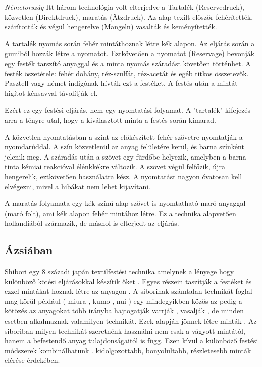 \documentclass[fontsize=12pt, appendixprefix=true]{scrreprt}
\begin{document}
\textit{Németország} 
Itt három technológia volt elterjedve a Tartalék (Reservedruck), közvetlen (Direktdruck), maratás (Ätzdruck). Az alap texílt először fehérítették, szárították és végül hengerelve (Mangeln) vasalták és keményítették.

A tartalék nyomás során fehér mintáthoznak létre kék alapon. Az eljárás során a gumiból hozzák létre a nyomatot. Eztkövetően a nyomatot (Reservage) bevonják egy festék tarszító anyaggal és a minta nyomás száradást követően történhet. A festék öszetétele: fehér dohány, réz-szulfát, réz-acetát és egéb titkos összetevők. Pasztell vagy német indigónak hívták ezt a festéket. A festés után a mintát higítot kénsavval távolítják el.

Ezért ez egy festési eljárás, nem egy nyomtatási folyamat. A "tartalék" kifejezés arra a tényre utal, hogy a kiválasztott minta a festés során kimarad.

A közvetlen nyomtatásban a színt az előkészített fehér szövetre nyomtatják a nyomdarúddal. A szín közvetlenül az anyag felületére kerül, és barna színként jelenik meg. A száradás után a szövet egy fürdőbe helyezik, amelyben a barna tinta kémiai reakcióval élénkkékre változik. A szövet végül felfőzik, újra hengerelik, eztkövetően használatra kész. A nyomtatást nagyon óvatosan kell elvégezni, mivel a hibákat nem lehet kijavítani.

A maratás folyamata egy kék színű alap szövet is nyomtatható maró anyaggal (maró folt), ami kék alapon fehér mintához létre. Ez a technika alapvetően hollandiából származik, de máshol is elterjedt az eljárás.


\subsection{Ázsiában}
Shibori egy 8 századi japán textilfestési technika amelynek a lényege hogy különböző kötési eljárásokkal készítik őket .
Egyes részein taszítják a festéket és ezzel mintákat hoznak létre az anyagon .
A siborinak számtalan technikát foglal mag körül   például ( miura , kumo  , nui  ) egy mindegyikben közös az pedig a kötözés az anyagokat több irányba hajtogatják 
varrják , vasalják , de minden esetben alkalmaznak valamilyen technikát.
Ezek alapján jönnek létre minták .
 Az  siboriban milyen technikát szeretnénk használni  nem csak a vágyott mintától, hanem a befestendő anyag tulajdonságaitól is függ. Ezen kívül  a különböző festési módszerek kombinálhatunk . 
  kidolgozottabb, bonyolultabb, részletesebb minták elérése érdekében. 
\end{document}
